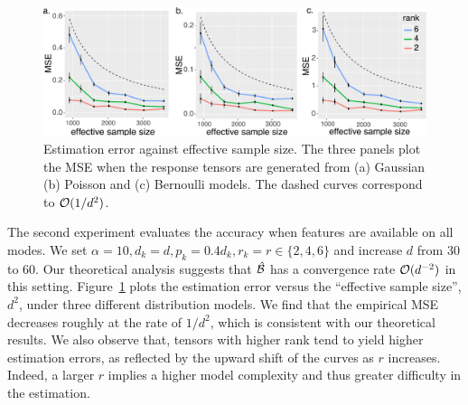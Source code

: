 \documentclass[12pt]{article}
\theoremstyle{definition}
\theoremstyle{definition}
\begin{document}
\begin{table}[tb]
\caption{Rank selection via BIC. The estimated ranks are averaged across 30 simulation. Bold number indicates the ground truth is within two standard deviations of the estimate.}\label{tab:rank}
\end{table}

\begin{figure}[!h]
\centering
\includegraphics[width=14cm]{dimension.pdf}
\caption{Estimation error against effective sample size. The three panels plot the MSE when the response tensors are generated from (a) Gaussian (b) Poisson and (c) Bernoulli models. The dashed curves correspond to $\mathcal{O}({1/d^2})$.}\label{fig:dim}
\end{figure}

The second experiment evaluates the accuracy when features are available on all modes. We set $\alpha=10, d_k=d, p_k=0.4d_k, r_k=r\in\{2,4,6\}$ and increase $d$ from 30 to 60. Our theoretical analysis suggests that $\hat {\mathcal{B}}$ has a convergence rate $\mathcal{O}(d^{-2})$ in this setting. Figure~\ref{fig:dim} plots the estimation error versus the ``effective sample size'', $d^2$, under three different distribution models. We find that the empirical MSE decreases roughly at the rate of $1/d^2$, which is consistent with our theoretical results. We also observe that, tensors with higher rank tend to yield higher estimation errors, as reflected by the upward shift of the curves as $r$ increases. Indeed, a larger $r$ implies a higher model complexity and thus greater difficulty in the estimation. 
\end{document}
